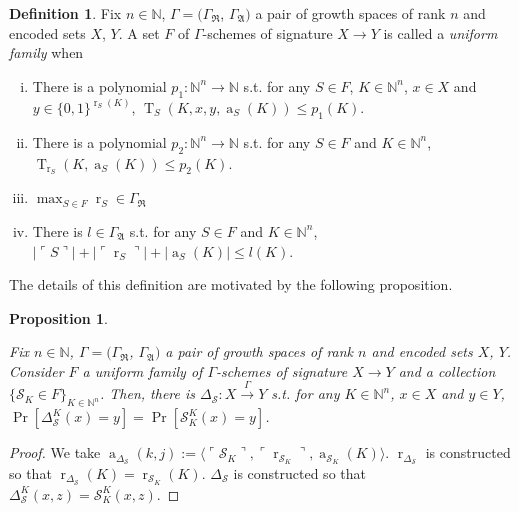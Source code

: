 \documentclass{article}
\numberwithin{equation}{section}
\theoremstyle{definition}
\newtheorem{definition}{Definition}[section]
\theoremstyle{plain}
\newtheorem{proposition}{Proposition}[section]
\newcommand{\Bool}{\{0,1\}}
\newcommand{\WordsLen}[1]{{\Bool^{#1}}}
\DeclareMathOperator{\T}{T}
\DeclareMathOperator{\R}{r}
\DeclareMathOperator{\A}{a}
\newcommand{\Nats}{\mathbb{N}}
\newcommand{\Abs}[1]{\lvert #1 \rvert}
\newcommand{\Chev}[1]{\langle #1 \rangle}
\newcommand{\Quote}[1]{\ulcorner #1 \urcorner}
\newcommand{\GrowR}{\Gamma_{\mathfrak{R}}}
\newcommand{\GrowA}{\Gamma_{\mathfrak{A}}}
\begin{document}
\begin{definition}

Fix $n \in \Nats$, $\Gamma=(\GrowR$, $\GrowA)$ a pair of growth spaces of rank $n$ and encoded sets $X$, $Y$. A set $F$ of $\Gamma$-schemes of signature $X \rightarrow Y$ is called a \emph{uniform family} when

\begin{enumerate}[(i)]

\item There is a polynomial $p_1: \Nats^n \rightarrow \Nats$ s.t. for any $S \in F$, $K \in \Nats^n$, $x \in X$ and $y \in \WordsLen{\R_S(K)}$, $\T_S(K,x,y,\A_S(K)) \leq p_1(K)$.

\item There is a polynomial $p_2: \Nats^n \rightarrow \Nats$ s.t. for any $S \in F$ and $K \in \Nats^n$, $\T_{\R_S}(K,\A_S(K)) \leq p_2(K)$.

\item $\max_{S \in F} \R_S \in \GrowR$

\item There is $l \in \GrowA$ s.t. for any $S \in F$ and $K \in \Nats^n$, ${\Abs{\Quote{S}} + \Abs{\Quote{\R_S}} + \Abs{\A_S(K)} \leq l(K)}$.

\end{enumerate}

\end{definition}

The details of this definition are motivated by the following proposition.

\begin{proposition}
\label{prp:fam_diag}

Fix $n \in \Nats$, $\Gamma=(\GrowR$, $\GrowA)$ a pair of growth spaces of rank $n$ and encoded sets $X$, $Y$. Consider $F$ a uniform family of $\Gamma$-schemes of signature $X \rightarrow Y$ and a collection $\{\mathcal{S}_K \in F\}_{K \in \Nats^n}$. Then, there is $\Delta_\mathcal{S}: X \xrightarrow{
\Gamma} Y$ s.t. for any $K \in \Nats^n$, $x \in X$ and $y \in Y$, $\Pr[\Delta_\mathcal{S}^K(x)=y] = \Pr[\mathcal{S}_K^K(x)=y]$.

\end{proposition}

\begin{proof}

We take $\A_{\Delta_{\mathcal{S}}}(k,j):=\Chev{\Quote{\mathcal{S}_K},\Quote{\R_{\mathcal{S}_K}},\A_{\mathcal{S}_K}(K)}$. $\R_{\Delta_{\mathcal{S}}}$ is constructed so that $\R_{\Delta_{\mathcal{S}}}(K)=\R_{\mathcal{S}_K}(K)$. $\Delta_{\mathcal{S}}$ is constructed so that $\Delta_{\mathcal{S}}^K(x,z)=\mathcal{S}_K^K(x,z)$.

\end{proof}
\end{document}
